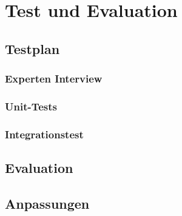\chapter{Test und Evaluation}
\section{Testplan}
\subsection{Experten Interview}
\subsection{Unit-Tests}
\subsection{Integrationstest}
\section{Evaluation}
\section{Anpassungen}